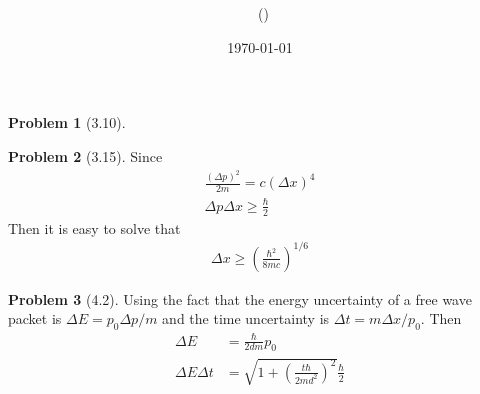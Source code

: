 \documentclass[twoside,11pt]{article}
\title{{\lms \Code \ \Ass}}
\author{\lms \name \ (\href{mailto:\mail}{\mail})}
\date{\sffamily \today}
\makeatletter
\theoremstyle{definition}
\newtheorem{problem}{Problem}
\theoremstyle{remark}
\newtheorem*{remark}{Remark}
\renewcommand{\maketitle}{\bgroup\setlength{\parindent}{0pt}
\begin{flushleft}
  \textbf{\Large\@title}

  \@author
\end{flushleft}\egroup
}
\makeatother
\begin{document}
\maketitle
\thispagestyle{title}


\begin{problem}[3.10]
\end{problem}


\begin{problem}[3.15]
Since
\begin{align*}
    \frac{(\Delta p)^2}{2m} = c(\Delta x)^4\\
    \Delta p\Delta x\geq \frac{\hbar}{2}
\end{align*}
Then it is easy to solve that 
\begin{align*}
    \Delta x \geq \left(\frac{\hbar^2}{8mc}\right)^{1/6}
\end{align*}
\end{problem}


\begin{problem}[4.2]
    Using the fact that the energy uncertainty of a free wave packet is
    $\Delta E = p_0\Delta p/m$ and the time uncertainty is
    $\Delta t = m\Delta x/p_0$.
    Then 
    \begin{align*}
        \Delta E &= \frac{\hbar}{2dm}p_0\\
        \Delta E\Delta t &= \sqrt{1+\left(\frac{t\hbar}{2md^2}\right)^2}\frac{\hbar}{2}
    \end{align*}
\end{problem}
\end{document}
